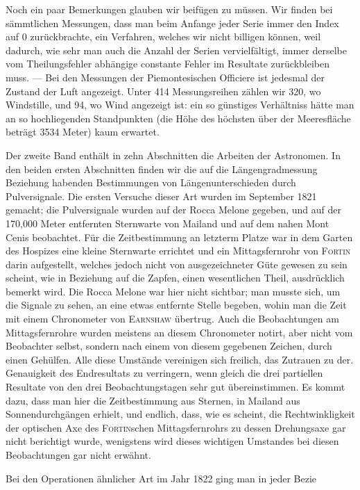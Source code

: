 \par
{}%
Noch ein paar Bemerkungen glauben wir beifügen zu müssen. Wir finden bei sämmtlichen Messungen, dass man beim Anfange jeder Serie immer den Index auf 0 zurückbrachte, ein Verfahren, welches wir nicht billigen können, weil dadurch, wie sehr man auch die Anzahl der Serien vervielfältigt, immer derselbe vom Theilungsfehler abhängige constante Fehler im Resultate zurückbleiben muss. --- Bei den Messungen der Piemontesischen Officiere ist jedesmal der Zustand der Luft angezeigt. Unter 414 Messungsreihen zählen wir 320, wo Windstille, und 94, wo Wind angezeigt ist: ein so günstiges Verhältniss hätte man an so hochliegenden Standpunkten (die Höhe des höchsten über der Meeresfläche beträgt 3534 Meter) kaum erwartet.

Der zweite Band enthält in zehn Abschnitten die Arbeiten der Astronomen. In den beiden ersten Abschnitten finden wir die auf die Längengradmessung Beziehung habenden Bestimmungen von Längenunterschieden durch Pulversignale. Die ersten Versuche dieser Art wurden im September 1821 gemacht; die Pulversignale wurden auf der Rocca Melone gegeben, und auf der 170,000 Meter entfernten Sternwarte von Mailand und auf dem nahen Mont Cenis beobachtet. Für die Zeitbestimmung an letzterm Platze war in dem Garten des Hospizes eine kleine Sternwarte errichtet und ein Mittagsfernrohr von \textsc{Fortin} darin aufgestellt, welches jedoch nicht von ausgezeichneter Güte gewesen zu sein scheint, wie in Beziehung auf die Zapfen, einen wesentlichen Theil, ausdrücklich bemerkt wird. Die Rocca Melone war hier nicht sichtbar; man musste sich, um die Signale zu sehen, an eine etwas entfernte Stelle begeben, wohin man die Zeit mit einem Chronometer von \textsc{Earnshaw} übertrug. Auch die Beobachtungen am Mittagsfernrohre wurden meistens an diesem Chronometer notirt, aber nicht vom Beobachter selbst, sondern nach einem von diesem gegebenen Zeichen, durch einen Gehülfen. Alle diese Umstände vereinigen sich freilich, das Zutrauen zu der. Genauigkeit des Endresultats zu verringern, wenn gleich die drei partiellen Resultate von den drei Beobachtungstagen sehr gut übereinstimmen. Es kommt dazu, dass man hier die Zeitbestimmung aus Sternen, in Mailand aus Sonnendurchgängen erhielt, und endlich, dass, wie es scheint, die Rechtwinkligkeit der optischen Axe des \textsc{Fortin}schen Mittagsfernrohrs zu dessen Drehungsaxe gar nicht berichtigt wurde, wenigstens wird dieses wichtigen Umstandes bei diesen Beobachtungen gar nicht erwähnt.

Bei den Operationen ähnlicher Art im Jahr 1822 ging man in jeder Bezie%
